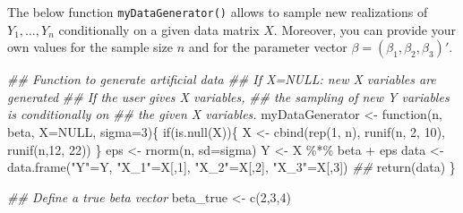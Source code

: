 \documentclass[
  letterpaper,
  DIV=11,
  numbers=noendperiod]{scrreprt}
\newenvironment{Shaded}{\begin{snugshade}}{\end{snugshade}}
\newcommand{\AttributeTok}[1]{\textcolor[rgb]{0.40,0.45,0.13}{#1}}
\newcommand{\ConstantTok}[1]{\textcolor[rgb]{0.56,0.35,0.01}{#1}}
\newcommand{\ControlFlowTok}[1]{\textcolor[rgb]{0.00,0.23,0.31}{#1}}
\newcommand{\DecValTok}[1]{\textcolor[rgb]{0.68,0.00,0.00}{#1}}
\newcommand{\DocumentationTok}[1]{\textcolor[rgb]{0.37,0.37,0.37}{\textit{#1}}}
\newcommand{\FunctionTok}[1]{\textcolor[rgb]{0.28,0.35,0.67}{#1}}
\newcommand{\NormalTok}[1]{\textcolor[rgb]{0.00,0.23,0.31}{#1}}
\newcommand{\OtherTok}[1]{\textcolor[rgb]{0.00,0.23,0.31}{#1}}
\newcommand{\SpecialCharTok}[1]{\textcolor[rgb]{0.37,0.37,0.37}{#1}}
\newcommand{\StringTok}[1]{\textcolor[rgb]{0.13,0.47,0.30}{#1}}
\theoremstyle{definition}
\theoremstyle{plain}
\theoremstyle{plain}
\theoremstyle{remark}
\begin{document}
The below function \texttt{myDataGenerator()} allows to sample new
realizations of \(Y_1,\dots,Y_n\) conditionally on a given data matrix
\(X\). Moreover, you can provide your own values for the sample size
\(n\) and for the parameter vector \(\beta=(\beta_1,\beta_2,\beta_3)'\).

\begin{Shaded}
\begin{Highlighting}[]
\DocumentationTok{\#\# Function to generate artificial data}
\DocumentationTok{\#\# If X=NULL: new X variables are generated}
\DocumentationTok{\#\# If the user gives X variables, }
\DocumentationTok{\#\# the sampling of new Y variables is conditionally on }
\DocumentationTok{\#\# the given X variables.}
\NormalTok{myDataGenerator }\OtherTok{\textless{}{-}} \ControlFlowTok{function}\NormalTok{(n, beta, }\AttributeTok{X=}\ConstantTok{NULL}\NormalTok{, }\AttributeTok{sigma=}\DecValTok{3}\NormalTok{)\{}
  \ControlFlowTok{if}\NormalTok{(}\FunctionTok{is.null}\NormalTok{(X))\{}
\NormalTok{    X   }\OtherTok{\textless{}{-}} \FunctionTok{cbind}\NormalTok{(}\FunctionTok{rep}\NormalTok{(}\DecValTok{1}\NormalTok{, n), }
                 \FunctionTok{runif}\NormalTok{(n, }\DecValTok{2}\NormalTok{, }\DecValTok{10}\NormalTok{), }
                 \FunctionTok{runif}\NormalTok{(n,}\DecValTok{12}\NormalTok{, }\DecValTok{22}\NormalTok{))}
\NormalTok{  \}}
\NormalTok{  eps  }\OtherTok{\textless{}{-}} \FunctionTok{rnorm}\NormalTok{(n, }\AttributeTok{sd=}\NormalTok{sigma)}
\NormalTok{  Y    }\OtherTok{\textless{}{-}}\NormalTok{ X }\SpecialCharTok{\%*\%}\NormalTok{ beta }\SpecialCharTok{+}\NormalTok{ eps}
\NormalTok{  data }\OtherTok{\textless{}{-}} \FunctionTok{data.frame}\NormalTok{(}\StringTok{"Y"}\OtherTok{=}\NormalTok{Y, }
                     \StringTok{"X\_1"}\OtherTok{=}\NormalTok{X[,}\DecValTok{1}\NormalTok{], }\StringTok{"X\_2"}\OtherTok{=}\NormalTok{X[,}\DecValTok{2}\NormalTok{], }\StringTok{"X\_3"}\OtherTok{=}\NormalTok{X[,}\DecValTok{3}\NormalTok{])}
  \DocumentationTok{\#\#}
  \FunctionTok{return}\NormalTok{(data)}
\NormalTok{\}}

\DocumentationTok{\#\# Define a true beta vector}
\NormalTok{beta\_true }\OtherTok{\textless{}{-}} \FunctionTok{c}\NormalTok{(}\DecValTok{2}\NormalTok{,}\DecValTok{3}\NormalTok{,}\DecValTok{4}\NormalTok{)}


\end{Highlighting}
\end{Shaded}
\end{document}

